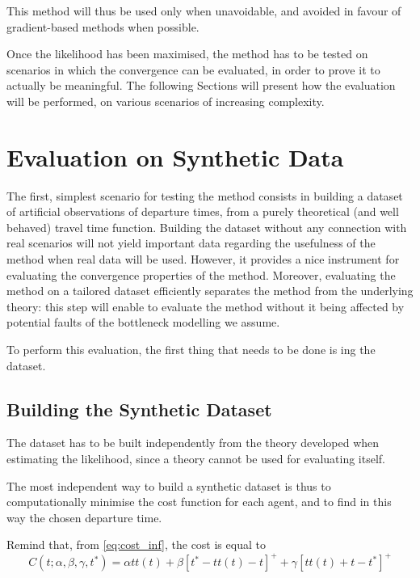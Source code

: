 This method will thus be used only when unavoidable,
and avoided in favour of gradient-based methods when possible.

Once the likelihood has been maximised,
the method has to be tested on scenarios in which the convergence can be evaluated,
in order to prove it to actually be meaningful.
The following Sections will present how the evaluation will be performed,
on various scenarios of increasing complexity.

\section{Evaluation on Synthetic Data}
\label{sec:eval_synth}

The first, simplest scenario for testing the method consists in building a dataset of artificial observations of departure times,
from a purely theoretical (and well behaved) travel time function.
Building the dataset without any connection with real scenarios will not yield important data regarding the usefulness of the method when real data will be used.
However, it provides a nice instrument for evaluating the convergence properties of the method.
Moreover, evaluating the method on a tailored dataset efficiently separates the method from the underlying theory:
this step will enable to evaluate the method without it being affected by potential faults of the bottleneck modelling we assume.

To perform this evaluation, the first thing that needs to be done is ing the dataset.

\subsection{Building the Synthetic Dataset}
\label{sec:synth_dataset}

The dataset has to be built independently from the theory developed when estimating the likelihood,
since a theory cannot be used for evaluating itself.

The most independent way to build a synthetic dataset is thus to computationally minimise the cost function for each agent,
and to find in this way the chosen departure time.

Remind that, from \eqref{eq:cost_inf}, the cost is equal to
\begin{equation*}
  C(t; \alpha, \beta, \gamma, t^*) = \alpha tt(t) + \beta[t^* - tt(t) - t]^+ + \gamma[tt(t) + t - t^*]^+
\end{equation*}

